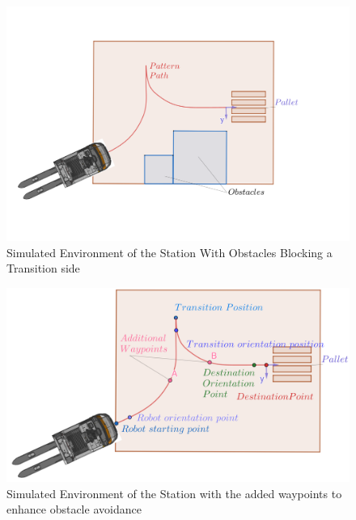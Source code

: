 \begin{figure}[H]
    \begin{center}
        \includegraphics[width=5in]{images/Chap2/Obstacles_In_Station.png} %
        \caption{Simulated Environment of the Station With Obstacles Blocking a Transition side}
        \label{Obstacle}
        \end{center}    
\end{figure}


\begin{figure}[H]
    \begin{center}
        \includegraphics[width=4.5in]{images/Chap2/Add_waypoints.png} %
        \caption{Simulated Environment of the Station with the added waypoints to enhance obstacle avoidance}
        \label{Add_waypoints}
        \end{center}    
\end{figure}


